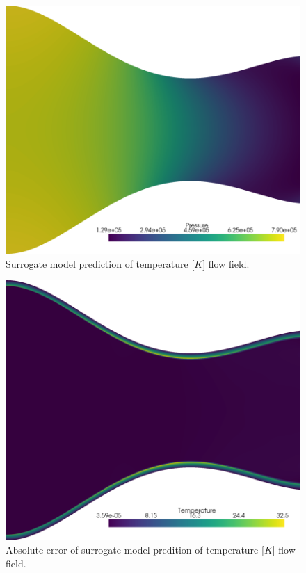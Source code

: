 \documentclass[10pt,oneside,a4paper,twocolumn]{article}
\begin{document}
\begin{figure}[htbp]
  \centering
  \includegraphics[width=0.8\columnwidth]{figures/Pressure_field_reconstructed.png}
  \caption{Surrogate model prediction of temperature [$K$] flow field.}
  \label{fig:prediction_temperature}
\end{figure}

\begin{figure}[htbp]
  \centering
  \includegraphics[width=0.8\columnwidth]{figures/Temperature_field_error.png}
  \caption{Absolute error of surrogate model predition of temperature [$K$] flow field.}
  \label{fig:error_temperature}
\end{figure}
\end{document}
